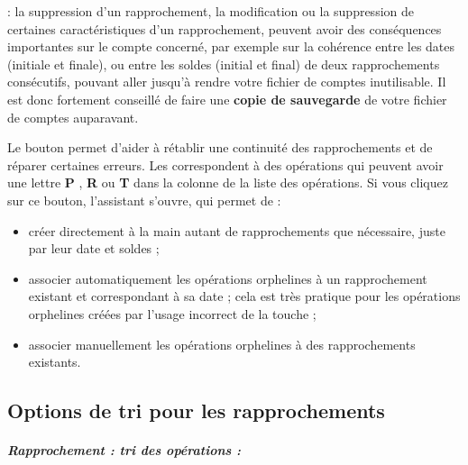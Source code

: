  : la suppression d'un rapprochement, la modification ou la suppression de certaines caractéristiques d'un rapprochement, peuvent avoir des conséquences importantes sur le compte concerné, par exemple sur la cohérence entre les dates (initiale et finale), ou entre les soldes (initial et final) de deux rapprochements consécutifs, pouvant aller jusqu'à rendre votre fichier de comptes inutilisable. Il est donc fortement conseillé de faire une \textbf{copie de sauvegarde} de votre fichier de comptes auparavant.


Le bouton  permet d'aider à rétablir une continuité des rapprochements et de réparer certaines erreurs. Les  correspondent à des opérations qui peuvent avoir une lettre \og \textbf{P} \fg{}, \og \textbf{R} \fg{} ou \og \textbf{T} \fg{} dans la colonne  de la liste des opérations. Si vous cliquez sur ce bouton, l'assistant s'ouvre, qui permet de  :

\begin{itemize}
	\item créer directement à la main autant de rapprochements que nécessaire, juste par leur date et soldes ;
	\item associer automatiquement les opérations orphelines à un rapprochement existant et correspondant à sa date ; cela est très pratique pour les opérations orphelines créées par l'usage incorrect de la touche  ;
	\item associer manuellement les opérations orphelines à des rapprochements existants.
\end{itemize}


\subsection{Options de tri pour les rapprochements\label{setup-operations-sort}}

\subparagraph{Rapprochement : tri des opérations :}

